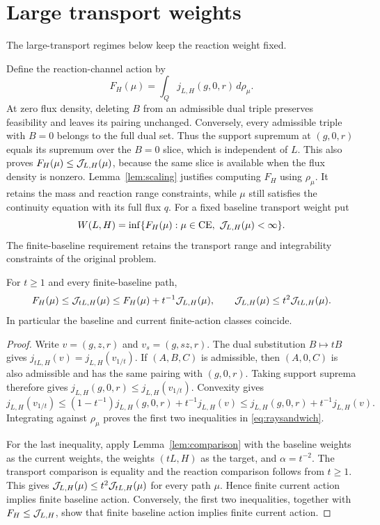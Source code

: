 \section{Large transport weights}\label{sec:large}
The large-transport regimes below keep the reaction weight fixed.

Define the reaction-channel action by
\[
 F_H(\mu)=\int_Qj_{L,H}(g,0,r)\,d\rho_\mu.
\]
At zero flux density, deleting $B$ from an admissible dual triple preserves
feasibility and leaves its pairing unchanged. Conversely, every admissible
triple with $B=0$ belongs to the full dual set. Thus the support supremum
at $(g,0,r)$ equals its supremum over the $B=0$ slice, which is independent
of $L$. This also proves $F_H(\mu)\le\mathcal J_{L,H}(\mu)$, because the same
slice is available when the flux density is nonzero.
Lemma~\ref{lem:scaling} justifies computing $F_H$ using $\rho_\mu$.
It retains the mass and reaction range constraints, while $\mu$ still
satisfies the continuity equation with its full flux $q$. For a fixed
baseline transport weight put
\begin{equation}\label{eq:freevalue}
 W(L,H)=\inf\{F_H(\mu):\mu\in\operatorname{CE},\ \mathcal J_{L,H}(\mu)<\infty\}.
\end{equation}
The finite-baseline requirement retains the transport range and
integrability constraints of the original problem.

\begin{lemma}\label{lem:ray}
For $t\ge1$ and every finite-baseline path,
\begin{equation}\label{eq:raysandwich}
 F_H(\mu)\le\mathcal J_{tL,H}(\mu)
 \le F_H(\mu)+t^{-1}\mathcal J_{L,H}(\mu),
 \qquad\mathcal J_{L,H}(\mu)\le t^2\mathcal J_{tL,H}(\mu).
\end{equation}
In particular the baseline and current finite-action classes coincide.
\end{lemma}
\begin{proof}
Write $v=(g,z,r)$ and $v_s=(g,sz,r)$. The dual substitution $B\mapsto tB$
gives $j_{tL,H}(v)=j_{L,H}(v_{1/t})$. If $(A,B,C)$ is admissible, then
$(A,0,C)$ is also admissible and has the same pairing with $(g,0,r)$.
Taking support suprema therefore gives
$j_{L,H}(g,0,r)\le j_{L,H}(v_{1/t})$.
Convexity gives
\[
 j_{L,H}(v_{1/t})\le(1-t^{-1})j_{L,H}(g,0,r)+t^{-1}j_{L,H}(v)
 \le j_{L,H}(g,0,r)+t^{-1}j_{L,H}(v).
\]
Integrating against $\rho_\mu$ proves the first two inequalities in
\eqref{eq:raysandwich}.

For the last inequality, apply Lemma~\ref{lem:comparison} with the
baseline weights as the current weights, the weights $(tL,H)$ as the
target, and $\alpha=t^{-2}$. The transport comparison is equality and
the reaction comparison follows from $t\ge1$. This gives
$\mathcal J_{L,H}(\mu)\le t^2\mathcal J_{tL,H}(\mu)$ for every path $\mu$. Hence finite current action
implies finite baseline action. Conversely, the first two inequalities,
together with $F_H\le\mathcal J_{L,H}$, show that finite baseline action implies
finite current action.
\end{proof}

